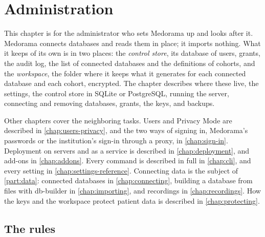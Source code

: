 \chapter{Administration}
\label{chap:administration}

This chapter is for the administrator who sets Medorama up and looks after it. Medorama connects
databases and reads them in place; it imports nothing. What it keeps of its own is in two
places: the \emph{control store}, its database of users, grants, the audit log, the list of
connected databases and the definitions of cohorts, and the \emph{workspace}, the folder where it
keeps what it generates for each connected database and each cohort, encrypted. The chapter
describes where these live, the settings, the control store in SQLite or PostgreSQL, running the
server, connecting and removing databases, grants, the keys, and backups.

Other chapters cover the neighboring tasks. Users and Privacy Mode are described in
\cref{chap:users-privacy}, and the two ways of signing in, Medorama's passwords or the
institution's sign-in through a proxy, in \cref{chap:sign-in}. Deployment on servers and as a
service is described in \cref{chap:deployment}, and add-ons in \cref{chap:addons}. Every command
is described in full in \cref{chap:cli}, and every setting in \cref{chap:settings-reference}.
Connecting data is the subject of \cref{part:data}: connected databases in
\cref{chap:connecting}, building a database from files with db-builder in \cref{chap:importing},
and recordings in \cref{chap:recordings}. How the keys and the workspace protect patient data is
described in \cref{chap:protecting}.

\section{The rules}
\label{sec:administration-rules}

